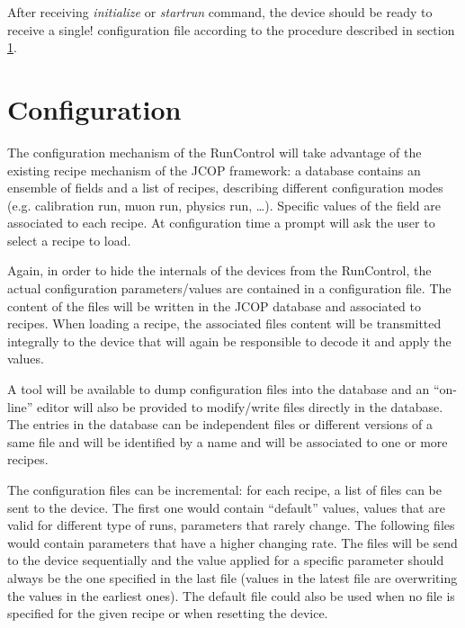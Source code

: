 \documentclass[a4paper]{article}
\begin{document}
After receiving \textit{initialize} or \textit{startrun} command, the device
should be ready to receive a single! configuration file according to the
procedure described in section \ref{sec:configuration}.

\section{Configuration}\label{sec:configuration}
The configuration mechanism of the RunControl will take advantage of the existing recipe mechanism
of the JCOP\cite{biblio:JCOP} framework: a database contains an ensemble of fields and a list of
recipes, describing different configuration modes (e.g. calibration run, muon
run, physics run, \ldots). Specific values of the field are associated to each
recipe. At configuration time a prompt will ask the user to select a recipe to load.

Again, in order to hide the internals of the devices from the RunControl, the actual configuration
parameters/values are contained in a configuration file. The content of the files will be written in
the JCOP database and associated to recipes. When loading a recipe, the associated files content
will be transmitted integrally to the device that will again be responsible to decode it and apply
the values.

A tool will be available to dump configuration files into the database and an ``on-line'' editor will
also be provided to modify/write files directly in the database. The entries in the database can be
independent files or different versions of a same file and will be identified by a name and will
be associated to one or more recipes.

The configuration files can be incremental: for each recipe, a list of files can be sent to the
device. The first one would contain ``default'' values, values that are valid for different type of
runs, parameters that rarely change. The following files would contain parameters that have a
higher changing rate. The files will be send to the device sequentially and the value applied for a
specific parameter should always be the one specified in the last file (values in the latest file
are overwriting the values in the earliest ones). The default file could also be used when no file
is specified for the given recipe or when resetting the device.
\end{document}
